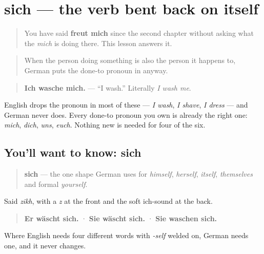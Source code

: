 \section[sich]{sich — the verb bent back on itself}

\label{lesson:GE-C37-sich}



\begin{quote}
You have said \textbf{freut mich} since the second chapter without asking what the \emph{mich} is doing there. This lesson answers it.
\end{quote}

\begin{grammarlens}[title={Grammar Lens: when the doer and the done-to are the same}]
\begin{quote}
When the person doing something is also the person it happens to, German puts the done-to pronoun in anyway.
\end{quote}

\begin{quote}
\textbf{Ich wasche mich.} — \textquotedblleft{}I wash.\textquotedblright{} Literally \emph{I wash me}.
\end{quote}

English drops the pronoun in most of these — \emph{I wash}, \emph{I shave}, \emph{I dress} — and German never does. Every done-to pronoun you own is already the right one: \emph{mich}, \emph{dich}, \emph{uns}, \emph{euch}. Nothing new is needed for four of the six.
\end{grammarlens}

\subsection*{You'll want to know: sich}
\begin{quote}
\textbf{sich} — the one shape German uses for \emph{himself}, \emph{herself}, \emph{itself}, \emph{themselves} and formal \emph{yourself}.
\end{quote}

Said \emph{zikh}, with a \emph{z} at the front and the soft ich-sound at the back.

\begin{quote}
\textbf{Er wäscht sich.} · \textbf{Sie wäscht sich.} · \textbf{Sie waschen sich.}
\end{quote}

Where English needs four different words with \emph{-self} welded on, German needs one, and it never changes.

